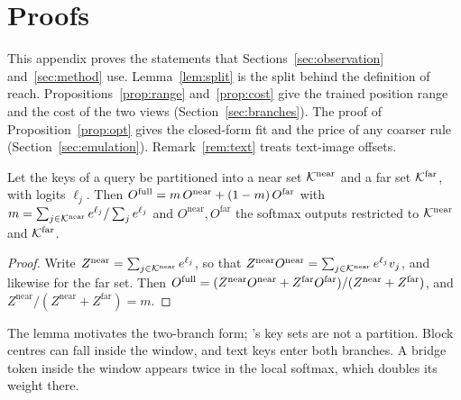 \apxbarrier
\section{Proofs}
\label{app:proofs}

This appendix proves the statements that Sections~\ref{sec:observation} and~\ref{sec:method} use. Lemma~\ref{lem:split} is the split behind the definition of reach. Propositions~\ref{prop:range} and~\ref{prop:cost} give the trained position range and the cost of the two views (Section~\ref{sec:branches}). The proof of Proposition~\ref{prop:opt} gives the closed-form fit and the price of any coarser rule (Section~\ref{sec:emulation}). Remark~\ref{rem:text} treats text-image offsets.

\begin{lemma}
\label{lem:split}
Let the keys of a query be partitioned into a near set $\mathcal{K}^{\mathrm{near}}$ and a far set $\mathcal{K}^{\mathrm{far}}$, with logits $\ell_j$. Then $O^{\mathrm{full}}=m\,O^{\mathrm{near}}+(1-m)\,O^{\mathrm{far}}$ with $m=\sum_{j\in\mathcal{K}^{\mathrm{near}}}e^{\ell_j}/\sum_{j}e^{\ell_j}$ and $O^{\mathrm{near}},O^{\mathrm{far}}$ the softmax outputs restricted to $\mathcal{K}^{\mathrm{near}}$ and $\mathcal{K}^{\mathrm{far}}$.
\end{lemma}
\begin{proof}
Write $Z^{\mathrm{near}}=\sum_{j\in\mathcal{K}^{\mathrm{near}}}e^{\ell_j}$, so that $Z^{\mathrm{near}}O^{\mathrm{near}}=\sum_{j\in\mathcal{K}^{\mathrm{near}}}e^{\ell_j}v_j$, and likewise for the far set. Then $O^{\mathrm{full}}=(Z^{\mathrm{near}}O^{\mathrm{near}}+Z^{\mathrm{far}}O^{\mathrm{far}})/(Z^{\mathrm{near}}+Z^{\mathrm{far}})$, and $Z^{\mathrm{near}}/(Z^{\mathrm{near}}+Z^{\mathrm{far}})=m$.
\end{proof}
The lemma motivates the two-branch form; \sca{}'s key sets are not a partition. Block centres can fall inside the window, and text keys enter both branches. A bridge token inside the window appears twice in the local softmax, which doubles its weight there.

